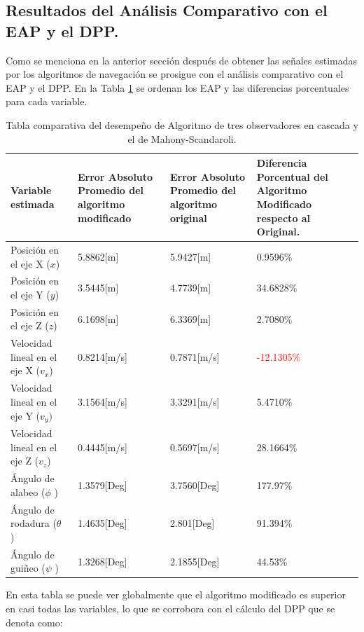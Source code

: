 \documentclass[10pt]{report}
\numberwithin{equation}{chapter}
\numberwithin{algorithm}{chapter}
\begin{document}
\subsection{Resultados del Análisis Comparativo con el EAP y el DPP.}
Como se menciona en la anterior sección después de obtener las señales estimadas por los algoritmos de navegación se prosigue con el análisis comparativo con el EAP y el DPP. En la Tabla \ref{resultados_tb1} se ordenan los EAP y las diferencias porcentuales para cada variable.\par
\begin{table}
\begin{center}
\begin{tabular}{|p{2in}|p{1.0in}|p{1.0in}|p{1.0in}|} \hline
\textbf{Variable estimada}&\small\textbf{Error Absoluto Promedio del algoritmo modificado}&\small\textbf{Error Absoluto Promedio del algoritmo original}&\small\textbf{Diferencia Porcentual del Algoritmo Modificado respecto al Original.} \\ \hline
Posición en el eje X ($x$) &5.8862[m]&5.9427[m]&0.9596\%\\ \hline
Posición en el eje Y ($y$) &3.5445[m]&4.7739[m]&34.6828\%\\ \hline
Posición en el eje Z ($z$)&6.1698[m]&6.3369[m]&2.7080\%\\ \hline
Velocidad lineal en el eje X ($v_x$) &0.8214[m/s]&0.7871[m/s]&\textcolor{red}{-12.1305\%}\\ \hline
Velocidad lineal en el eje Y ($v_y)$&3.1564[m/s]&3.3291[m/s]&5.4710\%\\ \hline
Velocidad lineal en el eje Z ($v_z$)&0.4445[m/s]&0.5697[m/s]&28.1664\%\\ \hline
Ángulo de alabeo ($\phi$ )&1.3579[Deg]&3.7560[Deg]&177.97\%\\ \hline
Ángulo de rodadura ($\theta$ )&1.4635[Deg]&2.801[Deg]&91.394\%\\ \hline
Ángulo de guiñeo ($\psi$ )&1.3268[Deg]&2.1855[Deg]&44.53\%\\ \hline
\end{tabular}
\caption{Tabla comparativa del desempeño de Algoritmo de tres observadores en cascada y el de Mahony-Scandaroli.}
\label{resultados_tb1}
\end{center}
\end{table}
En esta tabla se puede ver globalmente que el algoritmo modificado es superior en casi todas las variables, lo que se corrobora con el cálculo del DPP que se denota como:
\end{document}
